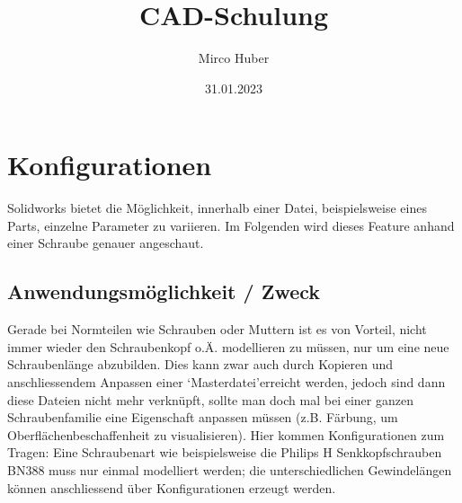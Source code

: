 \documentclass[12pt,a4paper]{article}
\title{CAD-Schulung}
\author{Mirco Huber}
\date{31.01.2023}
\begin{document}
	\maketitle
	\newpage
	\section{Konfigurationen}
	Solidworks bietet die Möglichkeit, innerhalb einer Datei, beispielsweise eines Parts, einzelne Parameter zu variieren. Im Folgenden wird dieses Feature anhand einer Schraube genauer angeschaut.
	\subsection{Anwendungsmöglichkeit / Zweck}
	Gerade bei Normteilen wie Schrauben oder Muttern ist es von Vorteil, nicht immer wieder den Schraubenkopf o.Ä. modellieren zu müssen, nur um eine neue Schraubenlänge abzubilden. Dies kann zwar auch durch Kopieren und anschliessendem Anpassen einer \lq Masterdatei\rq erreicht werden, jedoch sind dann diese Dateien nicht mehr verknüpft, sollte man doch mal bei einer ganzen Schraubenfamilie eine Eigenschaft anpassen müssen (z.B. Färbung, um Oberflächenbeschaffenheit zu visualisieren). Hier kommen Konfigurationen zum Tragen: Eine Schraubenart wie beispielsweise die Philips H Senkkopfschrauben BN388 muss nur einmal modelliert werden; die unterschiedlichen Gewindelängen können anschliessend über Konfigurationen erzeugt werden. 
\end{document}
